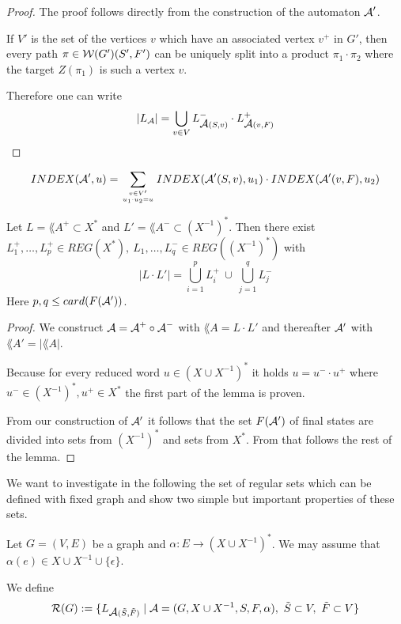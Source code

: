 \begin{proof}
The proof follows directly from the construction of the automaton $\mbox{$\mathcal{A}$}'$.

If $V'$ is the set of the vertices $v$ which have an associated vertex $v^+$ in
$G'$, then every path $\pi \in \mbox{$\mathcal{W}(G')$}(S', F')$ can be uniquely split into
a product $\pi_1 \cdot \pi_2$ where the target $Z(\pi_1)$ is such a vertex $v$.

Therefore one can write
\[ |\mbox{$L_{\mathcal{A}}$}| = \bigcup_{v \in V} L_{\mbox{$\mathcal{A}$}(S, v)}^- \cdot L_{\mbox{$\mathcal{A}$}(v, F)}^+
\]
\end{proof}

\begin{corollary}
\[ INDEX(\mbox{$\mathcal{A}$}', u) = \sum_{v \in V' \atop u_1 \cdot u_2 = u}
INDEX(\mbox{$\mathcal{A}$}'(S, v), u_1) \cdot INDEX(\mbox{$\mathcal{A}$}'(v, F), u_2) \]
\end{corollary}

\begin{lemma}
Let $L = \lang{A}^+ \subset X^*$ and $L' = \lang{A}^- \subset (X^{-1})^*$. Then
there exist $L_1^+,\ldots,L_p^+ \in REG(X^*),\ L_1,\ldots,L_q^- \in
REG((X^{-1})^*)$ with
\[ |L \cdot L'| = \bigcup_{i=1}^{p} L_i^+ \ \cup\ \bigcup_{j=1}^{q} L_j^- \]
Here $p, q \leq card(F(\mbox{$\mathcal{A'}$}))$.
\end{lemma}

\begin{proof}
We construct $\mbox{$\mathcal{A}$} = \mbox{$\mathcal{A}$}^+ \circ \mbox{$\mathcal{A}$}^-$ with $\lang{A} = L \cdot L'$ and
thereafter $\mbox{$\mathcal{A'}$}$ with $\lang{A'} = |\lang{A}|$.

Because for every reduced word $u \in (X\cup X^{-1})^*$ it holds $u = u^- \cdot
u^+$ where $u^- \in (X^{-1})^*, u^+ \in X^*$ the first part of the lemma is
proven.

From our construction of $\mbox{$\mathcal{A'}$}$ it follows that the set $F(\mbox{$\mathcal{A'}$})$ of final
states are divided into sets from $(X^{-1})^*$ and sets from $X^*$. From that
follows the rest of the lemma.
\end{proof}

We want to investigate in the following the set of regular sets which can be
defined with fixed graph and show two simple but important properties of these
sets.

Let $G = (V, E)$ be a graph and $\alpha : E \to (X \cup X^{-1})^*$. We may
assume that $\alpha(e) \in X \cup X^{-1} \cup \{\epsilon\}$.

We define
\[ \mathcal{R}(G) := \{ L_{\mbox{$\mathcal{A}$}(\tilde{S},\tilde{F})} \mid \mbox{$\mathcal{A}$} = (G, X \cup
X^{-1}, S, F, \alpha),\ \tilde{S} \subset V,\ \tilde{F} \subset V \} \]


